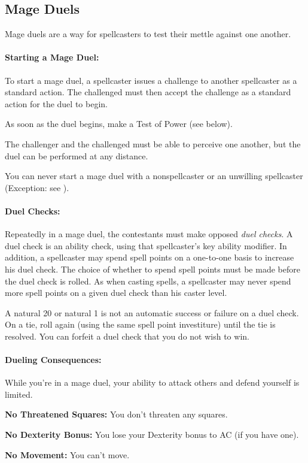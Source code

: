 \subsection{Mage Duels}
\label{sec:MageDuels}
Mage duels are a way for spellcasters to test their mettle against one another.

\paragraph{Starting a Mage Duel:} To start a mage duel, a spellcaster issues a challenge to another spellcaster as a standard action. The challenged must then accept the challenge as a standard action for the duel to begin.

As soon as the duel begins, make a Test of Power (see below).

The challenger and the challenged must be able to perceive one another, but the duel can be performed at any distance.

You can never start a mage duel with a nonspellcaster or an unwilling spellcaster (Exception: see ).
\paragraph{Duel Checks:} Repeatedly in a mage duel, the contestants must make opposed \emph{duel checks}. A duel check is an ability check, using that spellcaster's key ability modifier. In addition, a spellcaster may spend spell points on a one-to-one basis to increase his duel check. The choice of whether to spend spell points must be made before the duel check is rolled. As when casting spells, a spellcaster may never spend more spell points on a given duel check than his caster level.

A natural 20 or natural 1 is not an automatic success or failure on a duel check. On a tie, roll again (using the same spell point investiture) until the tie is resolved. You can forfeit a duel check that you do not wish to win.
\paragraph{Dueling Consequences:} While you're in a mage duel, your ability to attack others and defend yourself is limited.
\begin{list}{}{\leftmargin=1em}
 \item \textbf{No Threatened Squares:} You don't threaten any squares.
 \item \textbf{No Dexterity Bonus:} You lose your Dexterity bonus to AC (if you have one).
 \item \textbf{No Movement:} You can't move.
\end{list}
